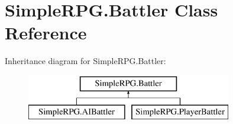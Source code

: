 \hypertarget{class_simple_r_p_g_1_1_battler}{\section{Simple\+R\+P\+G.\+Battler Class Reference}
\label{class_simple_r_p_g_1_1_battler}
}
Inheritance diagram for Simple\+R\+P\+G.\+Battler\+:\begin{figure}[H]
\begin{center}
\leavevmode
\includegraphics[height=2.000000cm]{class_simple_r_p_g_1_1_battler}
\end{center}
\end{figure}
